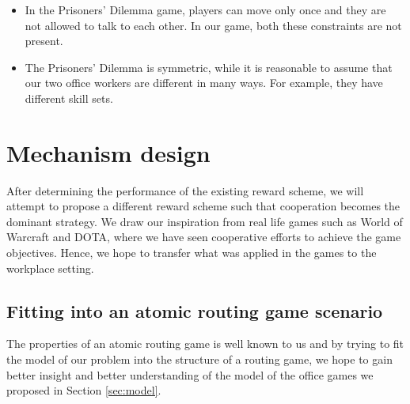 \documentclass[10pt, a4paper]{article}
\begin{document}
	\begin{itemize}
		\item In the Prisoners' Dilemma game, players can move only once and they are not allowed to talk to each other. In our game, both these constraints are not present.
		\item The Prisoners' Dilemma is symmetric, while it is reasonable to assume that our two office workers are different in many ways. For example, they have different skill sets.		
	\end{itemize}
	
	\section{Mechanism design}
	After determining the performance of the existing reward scheme, we will attempt to propose a different reward scheme such that cooperation becomes the dominant strategy. We draw our inspiration from real life games such as World of Warcraft and DOTA, where we have seen cooperative efforts to achieve the game objectives. Hence, we hope to transfer what was applied in the games to the workplace setting.
	
	\subsection{Fitting into an atomic routing game scenario}
	The properties of an atomic routing game is well known to us and by trying to fit the model of our problem into the structure of a routing game, we hope to gain better insight and better understanding of the model of the office games we proposed in Section \ref{sec:model}.
	
\end{document}
